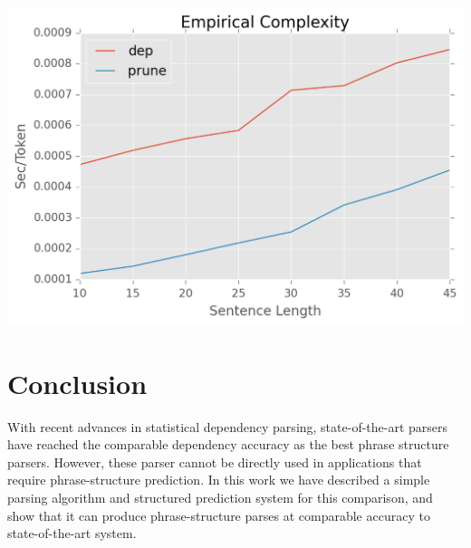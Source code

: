 \documentclass[11pt,letterpaper]{article}
\begin{document}


\begin{table}
  \centering

  \includegraphics[scale=0.4]{../notebooks/comp}
  \label{tab:speed}
  \caption{Experiments of parsing speed. (a) The speed of the parser on its own and with pruning. (b) The end-to-end speed of the parser when combined with different dependency parsers. }
\end{table}




\section{Conclusion}

With recent advances in statistical dependency parsing, state-of-the-art parsers
have reached the comparable  dependency accuracy as the best phrase structure parsers. However,
these parser cannot be directly used in applications that require phrase-structure prediction. In this work
we have described a simple parsing algorithm and structured prediction system for this comparison, and show that it
can produce phrase-structure parses at comparable accuracy to state-of-the-art system.
\end{document}
